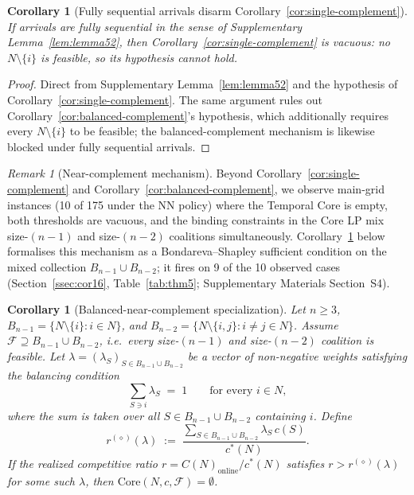 \documentclass[11pt]{article}
\theoremstyle{plain}
\newtheorem{corollary}[theorem]{Corollary}
\theoremstyle{definition}
\theoremstyle{remark}
\newtheorem{remark}[theorem]{Remark}
\newcommand{\F}{\mathcal{F}}
\newcommand{\cstar}{c^{\ast}}
\begin{document}
\begin{corollary}[Fully sequential arrivals disarm Corollary~\ref{cor:single-complement}]
\label{cor:cor51}
If arrivals are fully sequential in the sense of Supplementary Lemma~\ref{lem:lemma52}, then Corollary~\ref{cor:single-complement} is vacuous: no $N\setminus\{i\}$ is feasible, so its hypothesis cannot hold.
\end{corollary}

\begin{proof}
Direct from Supplementary Lemma~\ref{lem:lemma52} and the hypothesis of Corollary~\ref{cor:single-complement}. The same argument rules out Corollary~\ref{cor:balanced-complement}'s hypothesis, which additionally requires every $N\setminus\{i\}$ to be feasible; the balanced-complement mechanism is likewise blocked under fully sequential arrivals.
\end{proof}

\begin{remark}[Near-complement mechanism]
\label{rem:near-complement}
Beyond Corollary~\ref{cor:single-complement} and Corollary~\ref{cor:balanced-complement}, we observe main-grid instances (10 of 175 under the NN policy) where the Temporal Core is empty, both thresholds are vacuous, and the binding constraints in the Core LP mix size-$(n-1)$ and size-$(n-2)$ coalitions simultaneously. Corollary~\ref{cor:balanced-near-complement} below formalises this mechanism as a Bondareva--Shapley sufficient condition on the mixed collection $B_{n-1}\cup B_{n-2}$; it fires on 9 of the 10 observed cases (Section~\ref{ssec:cor16}, Table~\ref{tab:thm5}; Supplementary Materials Section~S4).
\end{remark}

\begin{corollary}[Balanced-near-complement specialization]
\label{cor:balanced-near-complement}
Let $n\ge 3$, $B_{n-1}=\{N\setminus\{i\}:i\in N\}$, and $B_{n-2}=\{N\setminus\{i,j\}:i\neq j\in N\}$. Assume $\F\supseteq B_{n-1}\cup B_{n-2}$, i.e.\ every size-$(n-1)$ and size-$(n-2)$ coalition is feasible. Let $\lambda=(\lambda_S)_{S\in B_{n-1}\cup B_{n-2}}$ be a vector of non-negative weights satisfying the balancing condition
\[
\sum_{S\ni i}\lambda_S \;=\; 1 \qquad \text{for every } i\in N,
\]
where the sum is taken over all $S\in B_{n-1}\cup B_{n-2}$ containing $i$. Define
\[
r^{(\diamond)}(\lambda) \;:=\; \frac{\sum_{S\in B_{n-1}\cup B_{n-2}}\lambda_S\,c(S)}{\cstar(N)}.
\]
If the realized competitive ratio $r = C(N)_{\text{online}}/\cstar(N)$ satisfies $r>r^{(\diamond)}(\lambda)$ for some such $\lambda$, then $\mathrm{Core}(N,c,\F)=\emptyset$.
\end{corollary}
\end{document}
